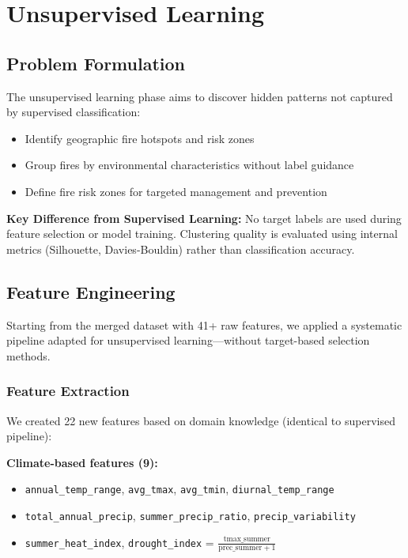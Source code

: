\chapter{Unsupervised Learning}

\section{Problem Formulation}
The unsupervised learning phase aims to discover hidden patterns not captured by supervised classification:
\begin{itemize}
    \item Identify geographic fire hotspots and risk zones
    \item Group fires by environmental characteristics without label guidance
    \item Define fire risk zones for targeted management and prevention
\end{itemize}

\textbf{Key Difference from Supervised Learning:} No target labels are used during feature selection or model training. Clustering quality is evaluated using internal metrics (Silhouette, Davies-Bouldin) rather than classification accuracy.

\section{Feature Engineering}

Starting from the merged dataset with 41+ raw features, we applied a systematic pipeline adapted for unsupervised learning---without target-based selection methods.

\subsection{Feature Extraction}
We created 22 new features based on domain knowledge (identical to supervised pipeline):

\textbf{Climate-based features (9):}
\begin{itemize}
    \item \texttt{annual\_temp\_range}, \texttt{avg\_tmax}, \texttt{avg\_tmin}, \texttt{diurnal\_temp\_range}
    \item \texttt{total\_annual\_precip}, \texttt{summer\_precip\_ratio}, \texttt{precip\_variability}
    \item \texttt{summer\_heat\_index}, \texttt{drought\_index} = $\frac{\text{tmax\_summer}}{\text{prec\_summer} + 1}$
\end{itemize}

